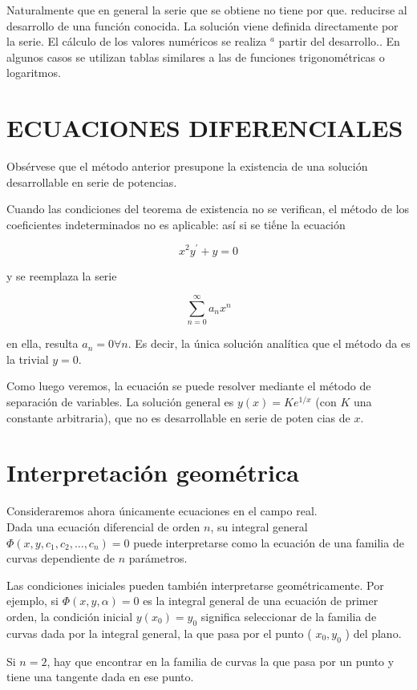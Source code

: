 \documentclass[10pt]{article}
\theoremstyle{plain}
\theoremstyle{definition}
\theoremstyle{remark}
\begin{document}
Naturalmente que en general la serie que se obtiene no tiene por que. reducirse al desarrollo de una función conocida. La solución viene definida directamente por la serie. El cálculo de los valores numéricos se realiza ${ }^{a}$ partir del desarrollo.. En algunos casos se utilizan tablas similares a las de funciones trigonométricas o logaritmos.

\section*{ECUACIONES DIFERENCIALES}
Obsérvese que el método anterior presupone la existencia de una solución desarrollable en serie de potencias.

Cuando las condiciones del teorema de existencia no se verifican, el método de los coeficientes indeterminados no es aplicable: así si se tiếne la ecuación

$$
x^{2} y^{\prime}+y=0
$$

y se reemplaza la serie

$$
\sum_{n=0}^{\infty} a_{n} x^{n}
$$

en ella, resulta $a_{n}=0 \forall n$. Es decir, la única solución analítica que el método da es la trivial $y=0$.

Como luego veremos, la ecuación se puede resolver mediante el método de separación de variables. La solución general es $y(x)=K e^{1 / x}$ (con $K$ una constante arbitraria), que no es desarrollable en serie de poten cias de $x$.

\section{Interpretación geométrica}
Consideraremos ahora únicamente ecuaciones en el campo real.\\
Dada una ecuación diferencial de orden $n$, su integral general $\Phi\left(x, y, c_{1}, c_{2}, \ldots, c_{n}\right)=0$ puede interpretarse como la ecuación de una familia de curvas dependiente de $n$ parámetros.

Las condiciones iniciales pueden también interpretarse geométricamente. Por ejemplo, si $\Phi(x, y, \alpha)=0$ es la integral general de una ecuación de primer orden, la condición inicial $y\left(x_{0}\right)=y_{0}$ significa seleccionar de la familia de curvas dada por la integral general, la que pasa por el punto ( $x_{0}, y_{0}$ ) del plano.

Si $n=2$, hay que encontrar en la familia de curvas la que pasa por un punto y tiene una tangente dada en ese punto.
\end{document}
